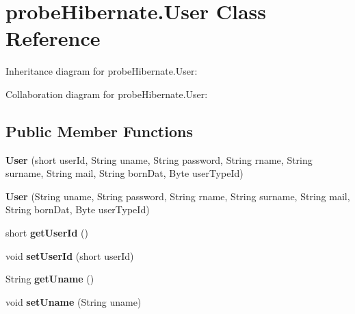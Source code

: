 \hypertarget{classprobe_hibernate_1_1_user}{}\section{probe\+Hibernate.\+User Class Reference}
\label{classprobe_hibernate_1_1_user}


Inheritance diagram for probe\+Hibernate.\+User\+:


Collaboration diagram for probe\+Hibernate.\+User\+:
\subsection*{Public Member Functions}
\begin{DoxyCompactItemize}
\item 
\mbox{\label{classprobe_hibernate_1_1_user_af42a8c38a60be420c4209bceb36c4856}} 
{\bfseries User} (short user\+Id, String uname, String password, String rname, String surname, String mail, String born\+Dat, Byte user\+Type\+Id)
\item 
\mbox{\label{classprobe_hibernate_1_1_user_a33d3cd81e0638c27400ab54874f34d9b}} 
{\bfseries User} (String uname, String password, String rname, String surname, String mail, String born\+Dat, Byte user\+Type\+Id)
\item 
\mbox{\label{classprobe_hibernate_1_1_user_aeb2c2e0aa1de30cff456e1060c4258d5}} 
short {\bfseries get\+User\+Id} ()
\item 
\mbox{\label{classprobe_hibernate_1_1_user_aadfadedb4adef645b16205ad523bcf24}} 
void {\bfseries set\+User\+Id} (short user\+Id)
\item 
\mbox{\label{classprobe_hibernate_1_1_user_ab440364ec62a1b81aaa3d1cb7b5d21e5}} 
String {\bfseries get\+Uname} ()
\item 
\mbox{\label{classprobe_hibernate_1_1_user_ad70a11e940014ab252ea427eb855281c}} 
void {\bfseries set\+Uname} (String uname)
\item 
\mbox{\label{classprobe_hibernate_1_1_user_a46a317c010e04c5e60e3d97c9d0eae9c}} 

\end{DoxyCompactItemize}
